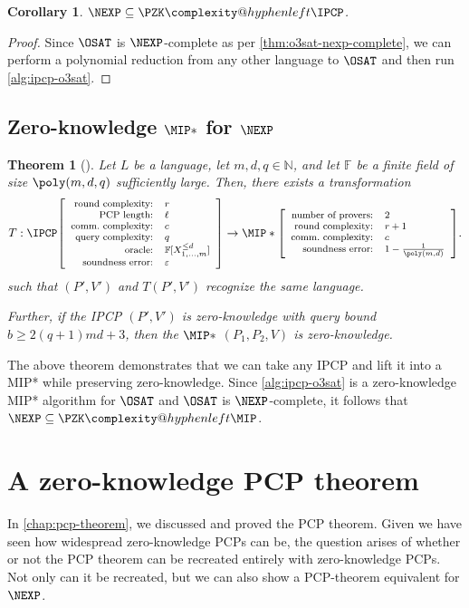 \documentclass[english,12pt]{reedthesis}
\makeatletter
\theoremstyle{plain}
\newtheorem{thm}{Theorem}[section]
\newtheorem{cor}[cor]{Corollary}
\theoremstyle{definition}
\theoremstyle{remark}
\newcommand{\ldipcp}[6]{%
  \ensuremath%
  \mleft[{\footnotesize\begin{array}{r l}
    \text{round complexity:} & #1 \\
    \text{PCP length:} & #2 \\
    \text{comm.\ complexity:} & #3 \\
    \text{query complexity:} & #4 \\
    \text{oracle:} & #5 \\
    \text{soundness error:} & #6
  \end{array}}\mright]%
}
\newcommand{\mipstar}[4]{%
  \ensuremath%
  \mleft[{\footnotesize\begin{array}{r l}
    \text{number of provers:} & #1 \\
    \text{round complexity:} & #2 \\
    \text{comm.\ complexity:} & #3 \\
    \text{soundness error:} & #4
  \end{array}}\mright]%
}
\newcommand{\PZKIPCP}{%
  \PZK\complexity@hyphenleft\IPCP
}
\newcommand{\PZKMIP}{%
  \PZK\complexity@hyphenleft\MIP
}
\makeatother
\begin{document}
\begin{cor}\label{nexp-pzkipcp}
  $\NEXP \subseteq \PZKIPCP$.
\end{cor}

\begin{proof}
  Since $\OSAT$ is $\NEXP$-complete as per \cref{thm:o3sat-nexp-complete}, we
  can perform a polynomial reduction from any other language to $\OSAT$ and then
  run \cref{alg:ipcp-o3sat}.
\end{proof}

\section{Zero-knowledge $\MIP*$ for $\NEXP$}\label{sec:zk-mipstar-nexp}

\begin{thm}[{\cite[Lemma 9.1]{CFGS22}}]\label{thm:lift-ipcp-mip}
  Let $L$ be a language, let $m, d, q \in \mathbb{N}$, and let $\mathbb{F}$ be a finite
  field of size $\poly(m, d, q)$ sufficiently large. Then, there exists a
  transformation
  \begin{equation*}
    T: \IPCP\ldipcp{r}{\ell}{c}{q}{\mathbb{F}[X_{1, \ldots, m}^{\le d}]}{\varepsilon}
    \rightarrow \MIP*\mipstar{2}{r+1}{c}{1 - \frac{1}{\poly(m, d)}}.
  \end{equation*}
  such that $(P', V')$ and $T(P', V')$ recognize the same language.

  Further, if the IPCP $(P', V')$ is zero-knowledge with query bound
  $b \ge 2(q+1)md + 3$, then the $\MIP*$ $(P_{1}, P_{2}, V)$ is zero-knowledge.
\end{thm}

The above theorem demonstrates that we can take any IPCP and lift it into a MIP*
while preserving zero-knowledge. Since \cref{alg:ipcp-o3sat} is a zero-knowledge
MIP* algorithm for $\OSAT$ and $\OSAT$ is $\NEXP$-complete, it follows that
$\NEXP \subseteq \PZKMIP$.

\chapter{A zero-knowledge PCP theorem}\label{chap:zk-pcp-theorem}

In \cref{chap:pcp-theorem}, we discussed and proved the PCP theorem. Given we
have seen how widespread zero-knowledge PCPs can be, the question arises of
whether or not the PCP theorem can be recreated entirely with zero-knowledge
PCPs. Not only can it be recreated, but we can also show a PCP-theorem
equivalent for $\NEXP$.
\end{document}

